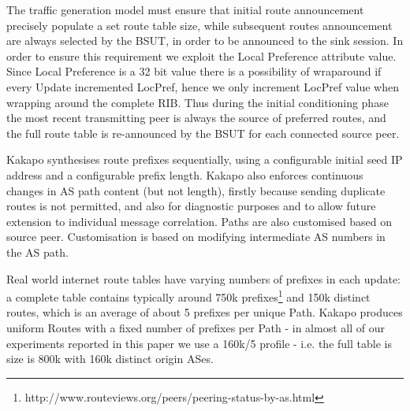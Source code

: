 The traffic generation model must ensure that initial route announcement
precisely populate a set route table size, while subsequent routes announcement
are always selected by the BSUT, in order to be announced to the sink session.
In order to ensure this requirement we exploit the Local Preference attribute value.
Since Local Preference is a 32 bit value there is a possibility of wraparound
if every Update incremented LocPref, hence we only increment LocPref value when
wrapping around the complete RIB.  Thus during the initial conditioning phase
the most recent transmitting peer is always the source of preferred routes, and
the full route table is re-announced by the BSUT for each connected source
peer.

Kakapo synthesises route prefixes sequentially, using a configurable initial
seed IP address and a configurable prefix length.  Kakapo also enforces
continuous changes in AS path content (but not length), firstly because sending
duplicate routes is not permitted, and also for diagnostic purposes and to
allow future extension to individual message correlation.  Paths are also
customised based on source peer.  Customisation is based on modifying
intermediate AS numbers in the AS path.

Real world internet route tables have varying numbers of prefixes in each
update: a complete table contains typically around 750k
prefixes\footnote{{http://www.routeviews.org/peers/peering-status-by-as.html}}
and 150k distinct routes, which is an average of about 5 prefixes per unique
Path.  Kakapo produces uniform Routes with a fixed number of prefixes per Path
- in almost all of our experiments reported in this paper we use a 160k/5
profile - i.e. the full table is size is 800k with 160k distinct origin ASes.

